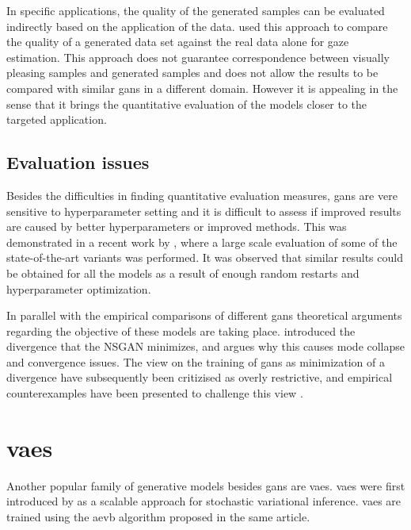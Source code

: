 In specific applications, the quality of the generated samples can be evaluated indirectly based on the application of the data. \textcite{shrivastava2016learning} used this approach to compare the quality of a generated data set against the real data alone for gaze estimation. This approach does not guarantee correspondence between visually pleasing samples and generated samples and does not allow the results to be compared with similar \acrshort{gans} in a different domain. However it is appealing in the sense that it brings the quantitative evaluation of the models closer to the targeted application. 

\subsection{Evaluation issues}
Besides the difficulties in finding quantitative evaluation measures, \acrshort{gans} are vere sensitive to hyperparameter setting and it is difficult to assess if improved results are caused by better hyperparameters or improved methods. This was demonstrated in a recent work by \textcite{lucic2017gans}, where a large scale evaluation of some of the state-of-the-art variants was performed. It was observed that similar results could be obtained for all the models as a result of enough random restarts and hyperparameter optimization.

In parallel with the empirical comparisons of different \acrshort{gans} theoretical arguments regarding the objective of these models are taking place. \textcite{arjovsky2017towards} introduced the divergence that the NSGAN minimizes, and argues why this causes mode collapse and convergence issues. The view on the training of \acrshort{gans} as minimization of a divergence have subsequently been critizised as overly restrictive, and empirical counterexamples have been presented to challenge this view \textcite{fedus2017many}.


\section{\acrlong{vaes}}
Another popular family of generative models besides \acrshort{gans} are \acrfull{vaes}. \acrlong{vaes} were first introduced by \textcite{kingma2013auto} as a scalable approach for stochastic variational inference. \acrshort{vaes} are trained using the \acrfull{aevb} algorithm proposed in the same article. 

